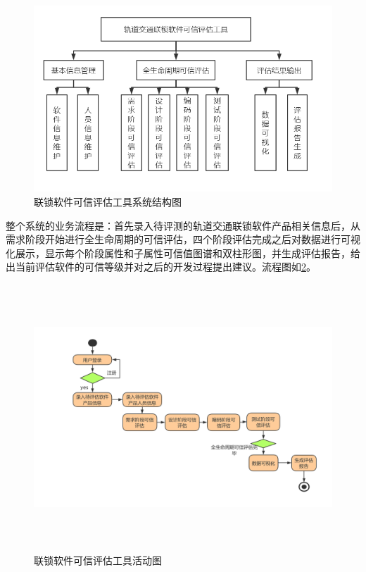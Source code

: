 \begin{figure}[htb]
	\centering
	\includegraphics[width=13cm]{fig/5_03_0.png}
	\caption{联锁软件可信评估工具系统结构图}
	\label{fig:5_03_0}
\end{figure}

整个系统的业务流程是：首先录入待评测的轨道交通联锁软件产品相关信息后，从需求阶段开始进行全生命周期的可信评估，四个阶段评估完成之后对数据进行可视化展示，显示每个阶段属性和子属性可信值图谱和双柱形图，并生成评估报告，给出当前评估软件的可信等级并对之后的开发过程提出建议。流程图如\ref{fig:5_02}。

\begin{figure}[htb]
	\centering
	\includegraphics[width=15cm,height=10cm]{fig/5_02.png}
	\caption{联锁软件可信评估工具活动图}
	\label{fig:5_02}
\end{figure}


